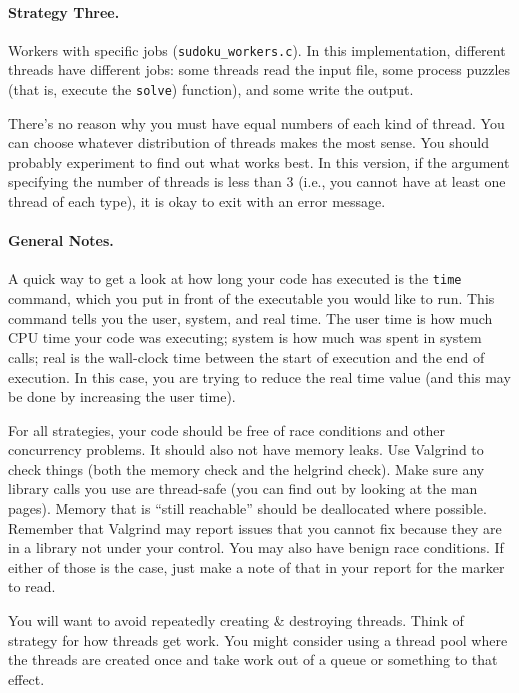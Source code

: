 \documentclass[letterpaper,10pt]{article}
\begin{document}
\paragraph{Strategy Three.} Workers with specific jobs (\texttt{sudoku\_workers.c}). In this implementation, different threads 
have different jobs: some threads read the input file, some process puzzles
(that is, execute the \texttt{solve}) function), 
and some write the output.
	
There's no reason why you must have equal numbers of each kind of thread.
You can choose whatever distribution of threads makes the most sense. You
should probably experiment to find out what works best. In this version,
if the argument specifying the number of threads is less than 3 (i.e., you
cannot have at least one thread of each type), it is okay to exit with an
error message.

\paragraph{General Notes.}
A quick way to get a look at how long your code has executed is the 
\texttt{time} command, which you put in front of the executable you would
like to run. This command tells you the user, system, and real time. The
user time is how much CPU time your code was executing; system is how much
was spent in system calls; real is the wall-clock time between the start of
execution and the end of execution. In this case, you are trying to reduce
the real time value (and this may be done by increasing the user time).


For all strategies, your code should be free of race conditions and other
concurrency problems. It should also not have memory leaks. Use Valgrind
to check things (both the memory check and the helgrind check). 
Make sure any library calls you use are thread-safe (you
can find out by looking at the man pages). Memory that is ``still reachable'' 
should be deallocated where possible. Remember that Valgrind may report
issues that you cannot fix because they are in a library not under your
control. You may also have benign race conditions. If either of those 
is the case, just make a note of that in your report for the marker to read.

You will want to avoid repeatedly creating \& destroying threads.
Think of strategy for how threads get work. You might consider using a thread 
pool where the threads are created once and take work out of a queue or
something to that effect.
\end{document}
